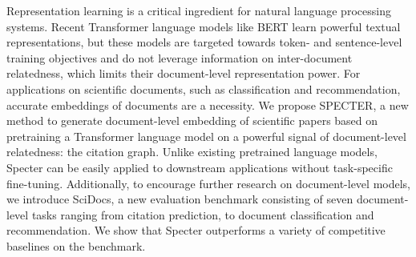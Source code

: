 Representation learning is a critical ingredient for natural language processing systems.  Recent Transformer language models like BERT learn powerful textual representations, but these models are targeted towards token- and sentence-level training objectives and do not leverage information on inter-document relatedness, which limits their document-level representation power. For applications on scientific documents, such as classification and recommendation, accurate embeddings of documents are a necessity. We propose SPECTER, a new method to generate document-level embedding of scientific papers based on pretraining a Transformer language model on a powerful signal of document-level relatedness: the citation graph. Unlike existing pretrained language models, Specter can be easily applied to downstream applications without task-specific fine-tuning. Additionally, to encourage further research on document-level models, we introduce SciDocs, a new evaluation benchmark consisting of seven document-level tasks ranging from citation prediction, to document classification and recommendation. We show that Specter outperforms a variety of competitive baselines on the benchmark.
